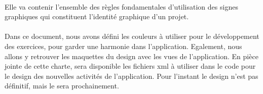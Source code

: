\paragraph{}Elle va contenir l'ensemble des règles fondamentales d'utilisation des signes graphiques qui constituent l'identité graphique d'un projet.
\paragraph{}Dans ce document, nous avons défini les couleurs à utiliser pour le développement des exercices, pour garder une harmonie dans l'application. Egalement, nous allons y retrouver les maquettes du design avec les vues de l'application. En pièce jointe de cette charte, sera disponible les fichiers xml à utiliser dans le code pour le design des nouvelles activités de l'application. Pour l'instant le design n'est pas définitif, mais le sera prochainement.
